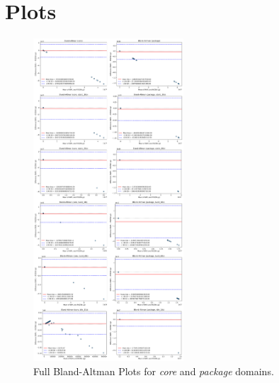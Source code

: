 \section{Plots}
\label{app:plots}

\begin{figure}[htbp]
    \centering
    \includegraphics[width=0.5\textwidth]{assets/bland_altman_full}
    \caption{Full Bland-Altman Plots for \emph{core} and \emph{package} domains.}
    \label{fig:plots_full}
\end{figure}
